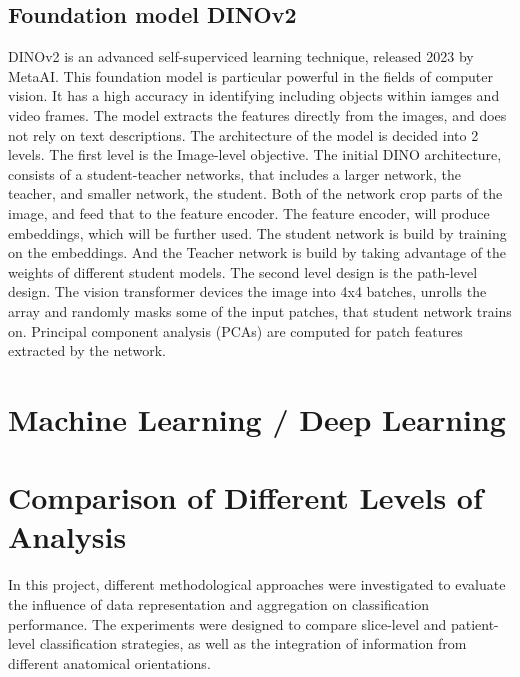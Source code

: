 \subsection{Foundation model DINOv2}
\label{DINO}
DINOv2 is an advanced self-superviced learning technique, released 2023 by MetaAI. This foundation model is particular powerful in the fields of computer vision. 
It has a high accuracy in identifying including objects within iamges and video frames.
The model extracts the features directly from the images, and does not rely on text descriptions.
The architecture of the model is decided into 2 levels. 
The first level is the Image-level objective. 
The initial DINO architecture, consists of a student-teacher networks, that includes a larger network, the teacher, and smaller network, the student. 
Both of the network crop parts of the image, and feed that to the feature encoder. The feature encoder, will produce
embeddings, which will be further used. The student network is build by training on the embeddings. 
And the Teacher network is build by taking advantage of the weights of different student models.
The second level design is the path-level design. The vision transformer devices the image into 4x4 batches, unrolls the array and
randomly masks some of the input patches, that student network trains on. Principal component analysis (PCAs) are computed for patch features extracted by the network. 
  

\section{Machine Learning / Deep Learning}
\label{sec:models}


\section{Comparison of Different Levels of Analysis}
\label{sec:statistics}

In this project, different methodological approaches were investigated to evaluate the influence of data representation and aggregation on classification performance. The experiments were designed to compare slice-level and patient-level classification strategies, as well as the integration of information from different anatomical orientations.

